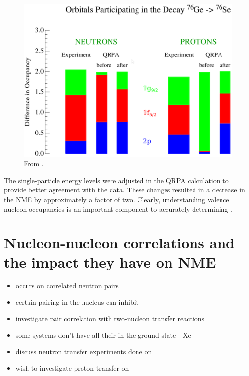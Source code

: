 \begin{figure}[htp]
\centering
\includegraphics[width=1.0\textwidth]{figures/occupancyDiffs.eps}
\caption{From \cite{schiffer_review}.}
\label{fig:occupancyDiffs}
\end{figure}
The single-particle energy levels were adjusted in the QRPA calculation \cite{SuhonenAdjustLevels} to provide better agreement with the data.  These changes resulted in a decrease in the NME by approximately a factor of two.  Clearly, understanding valence nucleon occupancies is an important component to accurately determining \NME. 


\section{Nucleon-nucleon correlations and the impact they have on NME}
\begin{itemize}
\item \zvbb occurs on correlated neutron pairs
\item certain pairing in the nucleus can inhibit \zvbb
\item investigate pair correlation with two-nucleon transfer reactions
\item some systems don't have all their \zp in the ground state - Xe
\item discuss neutron transfer experiments done on \GeTargets
\item wish to investigate proton transfer on \GeTargets
\end{itemize}


